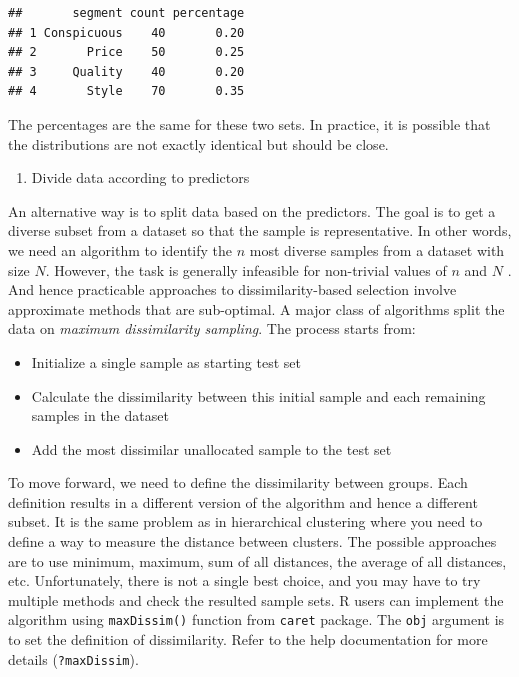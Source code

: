 \documentclass[12pt,]{krantz}
\providecommand{\tightlist}{%
  \setlength{\itemsep}{0pt}\setlength{\parskip}{0pt}}
\begin{document}
\begin{verbatim}
##       segment count percentage
## 1 Conspicuous    40       0.20
## 2       Price    50       0.25
## 3     Quality    40       0.20
## 4       Style    70       0.35
\end{verbatim}

The percentages are the same for these two sets. In practice, it is possible that the distributions are not exactly identical but should be close.

\begin{enumerate}
\def\labelenumi{(\arabic{enumi})}
\setcounter{enumi}{1}
\tightlist
\item
  Divide data according to predictors
\end{enumerate}

An alternative way is to split data based on the predictors. The goal is to get a diverse subset from a dataset so that the sample is representative. In other words, we need an algorithm to identify the \(n\) most diverse samples from a dataset with size \(N\). However, the task is generally infeasible for non-trivial values of \(n\) and \(N\) \citep{willett}. And hence practicable approaches to dissimilarity-based selection involve approximate methods that are sub-optimal. A major class of algorithms split the data on \emph{maximum dissimilarity sampling}. The process starts from:

\begin{itemize}
\tightlist
\item
  Initialize a single sample as starting test set
\item
  Calculate the dissimilarity between this initial sample and each remaining samples in the dataset
\item
  Add the most dissimilar unallocated sample to the test set
\end{itemize}

To move forward, we need to define the dissimilarity between groups. Each definition results in a different version of the algorithm and hence a different subset. It is the same problem as in hierarchical clustering where you need to define a way to measure the distance between clusters. The possible approaches are to use minimum, maximum, sum of all distances, the average of all distances, etc. Unfortunately, there is not a single best choice, and you may have to try multiple methods and check the resulted sample sets. R users can implement the algorithm using \texttt{maxDissim()} function from \texttt{caret} package. The \texttt{obj} argument is to set the definition of dissimilarity. Refer to the help documentation for more details (\texttt{?maxDissim}).
\end{document}
